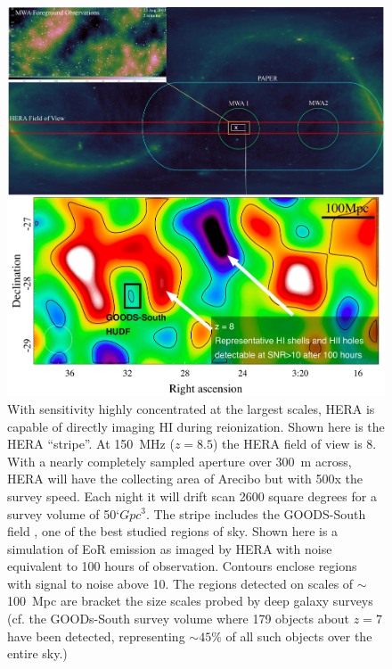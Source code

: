 \documentclass[preprint]{aastex}
\begin{document}

\begin{figure}[!ht]\centering
\includegraphics[width=\textwidth]{plots/Imaging/HERA_FoV_and_sim.jpg}%
\caption{\small
With sensitivity highly concentrated at the largest scales, HERA is capable of directly imaging HI during reionization.  Shown here is the HERA ``stripe''.  At 150~MHz ($z=8.5$) the HERA field of view is 8\arcdeg.  With a nearly completely sampled aperture over 300~m across, HERA will have the collecting area of Arecibo but with 500x the survey speed. Each night it will drift scan 2600 square degrees for a survey volume of 50`$Gpc^3$.  The stripe includes the GOODS-South field \citep{dickinson_et_al2003}, one of the best studied regions of sky.  Shown here is a simulation of EoR emission \citep{mcquinn_et_al2007} as imaged by HERA with noise equivalent to 100 hours of observation.  
Contours enclose regions with signal to noise above 10.  The regions detected on scales of $\sim$100~Mpc are bracket the size scales probed by deep galaxy surveys (cf. the GOODs-South survey volume where 179 objects about $z=7$ have been detected, representing $\sim45\%$ of all such objects over the entire sky.)  \label{fig:imaging}}
\end{figure}    
\end{document}
